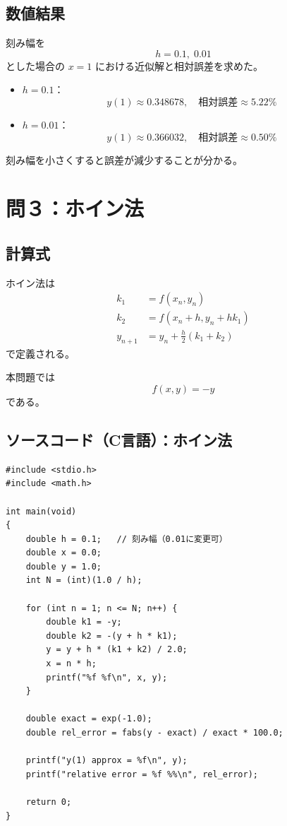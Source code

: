 \documentclass[10pt,a4paper,titlepage]{jreport} %
\begin{document}
\subsection{数値結果}

刻み幅を
\[
h=0.1,\;0.01
\]
とした場合の $x=1$ における近似解と相対誤差を求めた。

\begin{itemize}
\item $h=0.1$：
\[
y(1)\approx0.348678,\quad \text{相対誤差}\approx5.22\%
\]
\item $h=0.01$：
\[
y(1)\approx0.366032,\quad \text{相対誤差}\approx0.50\%
\]
\end{itemize}

刻み幅を小さくすると誤差が減少することが分かる。

\section{問３：ホイン法}

\subsection{計算式}

ホイン法は
\begin{align}
k_1 &= f(x_n,y_n) \\
k_2 &= f(x_n+h, y_n + hk_1) \\
y_{n+1} &= y_n + \frac{h}{2}(k_1+k_2)
\end{align}
で定義される。

本問題では
\[
f(x,y)=-y
\]
である。

\subsection{ソースコード（C言語）：ホイン法}

\begin{lstlisting}
#include <stdio.h>
#include <math.h>

int main(void)
{
    double h = 0.1;   // 刻み幅（0.01に変更可）
    double x = 0.0;
    double y = 1.0;
    int N = (int)(1.0 / h);

    for (int n = 1; n <= N; n++) {
        double k1 = -y;
        double k2 = -(y + h * k1);
        y = y + h * (k1 + k2) / 2.0;
        x = n * h;
        printf("%f %f\n", x, y);
    }

    double exact = exp(-1.0);
    double rel_error = fabs(y - exact) / exact * 100.0;

    printf("y(1) approx = %f\n", y);
    printf("relative error = %f %%\n", rel_error);

    return 0;
}
\end{lstlisting}
\end{document}
